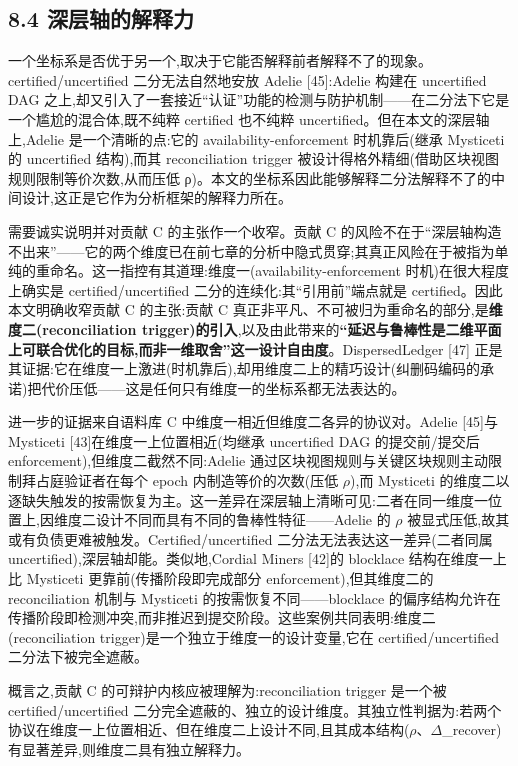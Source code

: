 \documentclass[UTF8,fontset=windows,a4paper,11pt]{ctexart}
\begin{document}
\subsection{8.4
深层轴的解释力}\label{ux6df1ux5c42ux8f74ux7684ux89e3ux91caux529b}

一个坐标系是否优于另一个,取决于它能否解释前者解释不了的现象。certified/uncertified
二分无法自然地安放 Adelie {[}45{]}:Adelie 构建在 uncertified DAG
之上,却又引入了一套接近``认证''功能的检测与防护机制------在二分法下它是一个尴尬的混合体,既不纯粹
certified 也不纯粹 uncertified。但在本文的深层轴上,Adelie
是一个清晰的点:它的 availability-enforcement 时机靠后(继承 Mysticeti 的
uncertified 结构),而其 reconciliation trigger
被设计得格外精细(借助区块视图规则限制等价次数,从而压低
ρ)。本文的坐标系因此能够解释二分法解释不了的中间设计,这正是它作为分析框架的解释力所在。

需要诚实说明并对贡献 C 的主张作一个收窄。贡献 C
的风险不在于``深层轴构造不出来''------它的两个维度已在前七章的分析中隐式贯穿;其真正风险在于被指为单纯的重命名。这一指控有其道理:维度一(availability-enforcement
时机)在很大程度上确实是 certified/uncertified
二分的连续化:其``引用前''端点就是 certified。因此本文明确收窄贡献 C
的主张:贡献 C
真正非平凡、不可被归为重命名的部分,是\textbf{维度二(reconciliation
trigger)的引入},以及由此带来的\textbf{``延迟与鲁棒性是二维平面上可联合优化的目标,而非一维取舍''这一设计自由度}。DispersedLedger
{[}47{]}
正是其证据:它在维度一上激进(时机靠后),却用维度二上的精巧设计(纠删码编码的承诺)把代价压低------这是任何只有维度一的坐标系都无法表达的。

进一步的证据来自语料库 C 中维度一相近但维度二各异的协议对。Adelie {[}45{]}与 Mysticeti {[}43{]}在维度一上位置相近(均继承 uncertified DAG 的提交前/提交后 enforcement),但维度二截然不同:Adelie 通过区块视图规则与关键区块规则主动限制拜占庭验证者在每个 epoch 内制造等价的次数(压低 $\rho$),而 Mysticeti 的维度二以逐缺失触发的按需恢复为主。这一差异在深层轴上清晰可见:二者在同一维度一位置上,因维度二设计不同而具有不同的鲁棒性特征------Adelie 的 $\rho$ 被显式压低,故其或有负债更难被触发。Certified/uncertified 二分法无法表达这一差异(二者同属 uncertified),深层轴却能。类似地,Cordial Miners {[}42{]}的 blocklace 结构在维度一上比 Mysticeti 更靠前(传播阶段即完成部分 enforcement),但其维度二的 reconciliation 机制与 Mysticeti 的按需恢复不同------blocklace 的偏序结构允许在传播阶段即检测冲突,而非推迟到提交阶段。这些案例共同表明:维度二(reconciliation trigger)是一个独立于维度一的设计变量,它在 certified/uncertified 二分法下被完全遮蔽。

概言之,贡献
C 的可辩护内核应被理解为:reconciliation trigger 是一个被
certified/uncertified 二分完全遮蔽的、独立的设计维度。其独立性判据为:若两个协议在维度一上位置相近、但在维度二上设计不同,且其成本结构($\rho$、$\Delta$\_recover)有显著差异,则维度二具有独立解释力。
\end{document}
